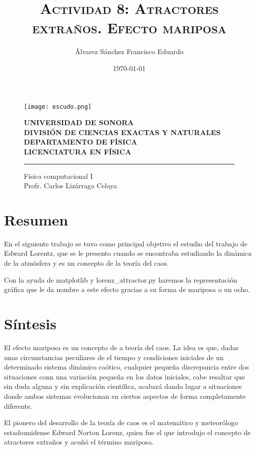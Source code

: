 
\author{Álvarez Sánchez Francisco Eduardo}
\title{\textbf{\textsc{Actividad 8: Atractores extraños. Efecto mariposa}}} 
\date{\today}



\begin{titlepage}
	\centering
    \begin{figure}[ht!]
    \centering
    \texttt{[image: escudo.png]}
    
    \textbf{UNIVERSIDAD DE SONORA \\ DIVISIÓN DE CIENCIAS EXACTAS Y NATURALES \\ DEPARTAMENTO DE FÍSICA \\ LICENCIATURA EN FÍSICA}
	\maketitle
    \hrule \bigskip
    \large{Física computacional I}\\
	Profr. Carlos Lizárraga Celaya
    \end{figure}
\thispagestyle{empty}
\end{titlepage}

\newpage

\section{Resumen}
\noindent En el siguiente trabajo se tuvo como principal objetivo el estudio del trabajo de Edward Lorentz, que se le presento cuando se encontraba estudiando la dinámica de la atmósfera y es un concepto de la teoría del caos.

Con la ayuda de matplotlib y lorenz\_attractor.py haremos la representación gráfica que le da nombre a este efecto gracias a su forma de mariposa o un ocho. 

\section{Síntesis}
\noindent El efecto mariposa es un concepto de a teoría del caos. La idea es que, dadas unas circunstancias peculiares de el tiempo y condiciones iniciales de un determinado sistema dinámico caótico, cualquier pequeña discrepancia entre dos situaciones conn una variación pequeña en los datos iniciales, cabe resaltar que sin duda alguna y sin explicación científica, acabará dando lugar a situaciones donde ambos sistemas evolucionan en ciertos aspectos de forma completamente diferente.

El pionero del desarrollo de la teoría de caos es el matemático y meteorólogo estadounidense Edward Norton Lorenz, quien fue el que introdujo el concepto de atractores extraños y acuñó el término mariposa. 

